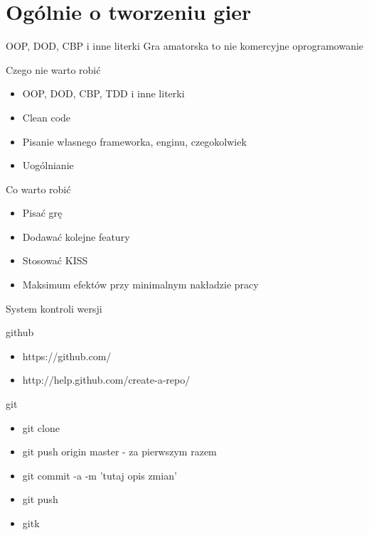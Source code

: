 \documentclass{beamer}
\begin{document}
\section{Ogólnie o tworzeniu gier}
\begin{frame}{OOP, DOD, CBP i inne literki}
  Gra amatorska to nie komercyjne oprogramowanie

  \begin{alertblock}{Czego nie warto robić}
    \begin{itemize}
    \item OOP, DOD, CBP, TDD i inne literki
    \item Clean code
    \item Pisanie własnego frameworka, enginu, czegokolwiek
    \item Uogólnianie
    \end{itemize}
  \end{alertblock}

  \begin{block}{Co warto robić}
    \begin{itemize}
    \item Pisać grę
    \item Dodawać kolejne featury
    \item Stosować KISS
    \item Maksimum efektów przy minimalnym nakładzie pracy
    \end{itemize}
  \end{block}

\end{frame}

\begin{frame}{System kontroli wersji}
  \begin{block}{github}
    \begin{itemize}
    \item https://github.com/
    \item http://help.github.com/create-a-repo/
    \end{itemize}
  \end{block}

  \begin{block}{git}
    \begin{itemize}
    \item git clone
    \item git push origin master - za pierwszym razem
    \item git commit -a -m 'tutaj opis zmian'
    \item git push
    \item gitk
    \end{itemize}
  \end{block}
\end{frame}
\end{document}
